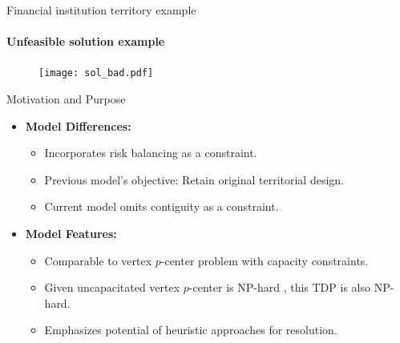 \documentclass{beamer}
\begin{document}
\begin{frame}{Financial institution territory example}
    \framesubtitle{Unfeasible solution example}
    \begin{figure}
        \centering
        \texttt{[image: sol\_bad.pdf]}
        \label{fig:instancia}
    \end{figure}
\end{frame}
\begin{frame}{Motivation and Purpose}
    \begin{itemize}
        \item \textbf{Model Differences:}
        \begin{itemize}
            \item Incorporates risk balancing as a constraint.
            \item Previous model's objective: Retain original territorial design.
            \item Current model omits contiguity as a constraint.
        \end{itemize}
        
        \item \textbf{Model Features:}
        \begin{itemize}
            \item Comparable to vertex $p$-center problem with capacity constraints.
            \item Given uncapacitated vertex $p$-center is NP-hard \cite{eswa2016}, this TDP is also NP-hard.
            \item Emphasizes potential of heuristic approaches for resolution.
        \end{itemize}
    \end{itemize}
\end{frame}
\end{document}
